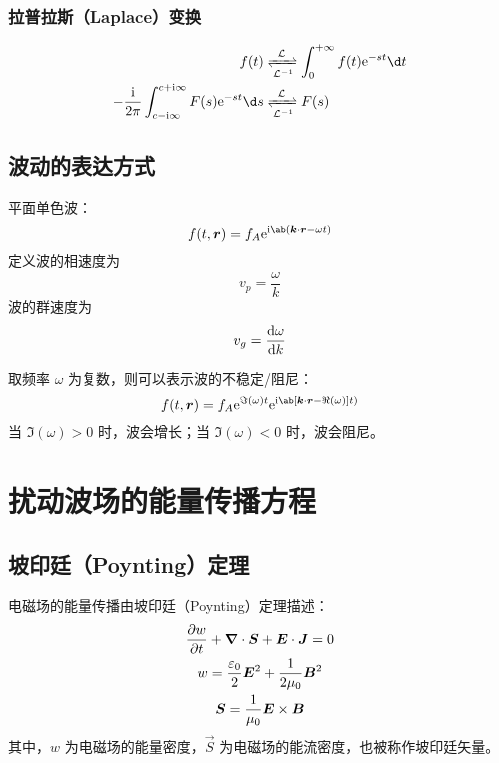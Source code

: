 \subsubsection{拉普拉斯（Laplace）变换}

\begin{equation}\begin{aligned}
f(t) &\LaplaceTs \int_0^{+\infty} f(t) \eu^{- s t} \d t \\
- \frac{\im}{2\pi}\int_{c-\im\infty}^{c+\im\infty} F(s) \eu^{- s t} \d s &\LaplaceTs F(s)\\
\end{aligned}\end{equation}

\subsection{波动的表达方式}

平面单色波：
\begin{equation}
f(t,\vec{r}) = f_A \eu^{\im\ab(\vec{k}\cdot\vec{r} - \omega t)}
\end{equation}
定义波的相速度为
\begin{equation}
v_p = \frac{\omega}{k}
\end{equation}
波的群速度为
\begin{equation}
v_g = \odv{\omega}{k}
\end{equation}

取频率 $\omega$ 为复数，则可以表示波的不稳定/阻尼：
\begin{equation}
f(t,\vec{r}) = f_A \eu^{\Im(\omega) t} \eu^{\im\ab[\vec{k}\cdot\vec{r} - \Re(\omega)] t)}
\end{equation}
当 $\Im(\omega)>0$ 时，波会增长；当 $\Im(\omega)<0$ 时，波会阻尼。

\section{扰动波场的能量传播方程}

\subsection{坡印廷（Poynting）定理}

电磁场的能量传播由坡印廷（Poynting）定理描述：
\begin{subequations}\begin{gather}
\pdv{w}{t} + \bm{\nabla} \cdot{\bm{S}} + \bm{E} \cdot \bm{J} = 0 \\
w = \frac{\varepsilon_0}{2} \bm{E}^2 + \frac{1}{2\mu_0} \bm{B}^2 \\
\bm{S} = \frac{1}{\mu_0} \bm{E} \times \bm{B}
\end{gather}\end{subequations}
其中，$w$ 为电磁场的能量密度，$\vec{S}$ 为电磁场的能流密度，也被称作坡印廷矢量。

